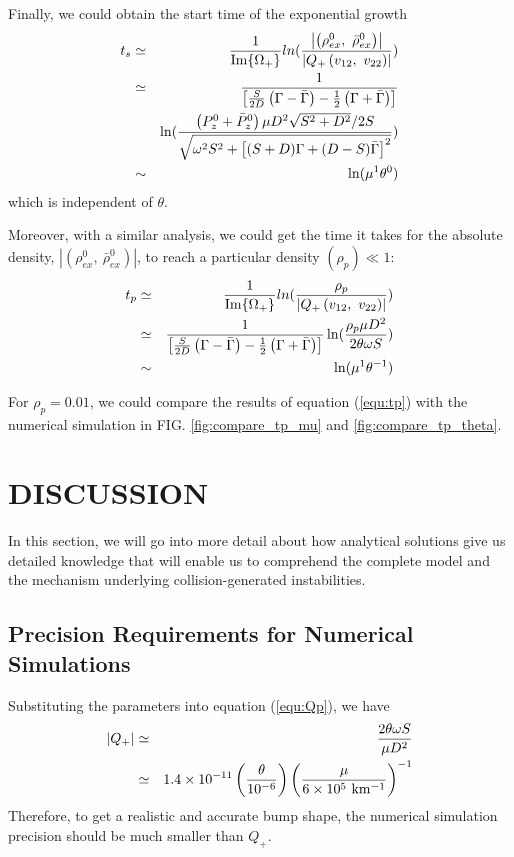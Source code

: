 \documentclass[aps,prd,twocolumn,amsmath,amssymb,groupedaddress]{revtex4-2}
\begin{document}
Finally, we could obtain the start time of the exponential growth
\begin{eqnarray}
	t_s	&\simeq& 
	\frac{1}{\rm{Im}\{\Omega_+\}}ln(\frac{\left| \left(\rho^0_{ex}, ~\bar{\rho}^0_{ex}\right) \right|}{\left|Q_+\left(v_{12}, ~ v_{22}\right)\right|})	\nonumber \\
	&\simeq&
	\frac{1}{\left[\frac{S}{2D}\left(\Gamma-\bar{\Gamma}\right)-\frac{1}{2}\left(\Gamma+\bar{\Gamma}\right)\right]} \nonumber \\
	&&\ln(\frac{ \left(P_{z}^0 + \bar{P}_{z}^0\right)\mu D^2\sqrt{S^2+D^2}/2S}{\sqrt{\omega^2S^2+\left[(S+D) \Gamma + (D-S) \bar{\Gamma}\right]^2}}) \\
	&\sim& \ln(\mu^1 \theta^0)
\end{eqnarray}
which is independent of $\theta$.

Moreover, with a similar analysis, we could get the time it takes for the absolute density, $\left| \left(\rho^0_{ex}, ~\bar{\rho}^0_{ex}\right) \right|$, to reach a particular density $(\rho_{p}) \ll 1$:
\begin{eqnarray}
	\label{equ:tp}
	t_{p}	&\simeq& 
	\frac{1}{\rm{Im}\{\Omega_+\}}ln(\frac{\rho_{p}}{\left|Q_+\left(v_{12}, ~ v_{22}\right)\right|})	\nonumber \\
	&\simeq&
	\frac{1}{\left[\frac{S}{2D}\left(\Gamma-\bar{\Gamma}\right)-\frac{1}{2}\left(\Gamma+\bar{\Gamma}\right)\right]} \ln(\frac{\rho_{p} \mu D^2}{2\theta \omega S}) \\
	&\sim& \ln(\mu^1 \theta^{-1})
\end{eqnarray}

For $\rho_p = 0.01$, we could compare the results of equation (\ref{equ:tp}) with the numerical simulation in FIG. \ref{fig:compare_tp_mu} and \ref{fig:compare_tp_theta}.

\section{\label{sec:disscussion} DISCUSSION}
In this section, we will go into more detail about how analytical solutions give us detailed knowledge that will enable us to comprehend the complete model and the mechanism underlying collision-generated instabilities.

\subsection{\label{subsec:precision_of_num}Precision Requirements for Numerical Simulations}
Substituting the parameters into equation (\ref{equ:Qp}), we have 
\begin{eqnarray}
	\label{equ:Qp_num}
	\left|Q_+\right|
	&\simeq&
	\frac{2 \theta\omega S}{\mu D^2}\nonumber \\
	&\simeq&
	1.4 \times 10^{-11} \left(\frac{\theta}{10^{-6}}\right) \left(\frac{\mu}{6 \times 10^5 \rm{~km^{-1}}}\right)^{-1}
\end{eqnarray}
Therefore, to get a realistic and accurate bump shape, the numerical simulation precision should be much smaller than $Q_+$. 
\end{document}
